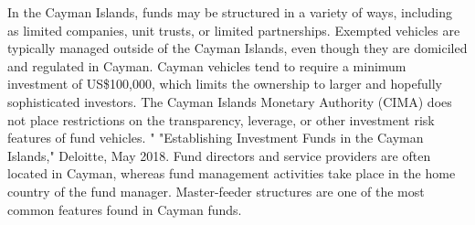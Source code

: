 \documentclass[11pt]{article}
\begin{document}
In the Cayman Islands, funds may be structured in a variety of ways, including as limited companies, unit trusts, or limited partnerships. Exempted vehicles are typically managed outside of the Cayman Islands, even though they are domiciled and regulated in Cayman. Cayman vehicles tend to require a minimum investment of US\$100,000, which limits the ownership to larger and hopefully sophisticated investors. The Cayman Islands Monetary Authority (CIMA) does not place restrictions on the transparency, leverage, or other investment risk features of fund vehicles. " "Establishing Investment Funds in the Cayman Islands," Deloitte, May 2018. Fund directors and service providers are often located in Cayman, whereas fund management activities take place in the home country of the fund manager. Master-feeder structures are one of the most common features found in Cayman funds.
\end{document}
